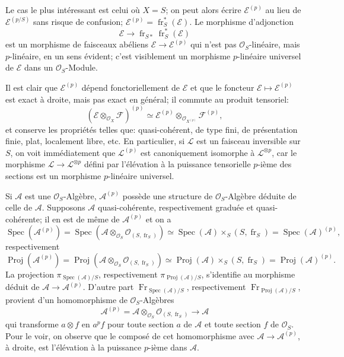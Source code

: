 \documentclass[11pt]{article}
\DeclareMathOperator{\Spec}{Spec}
\providecommand{\OO}{\mathcal{O}}
\providecommand{\cE}{\mathcal E}
\providecommand{\cF}{\mathcal F}
\providecommand{\Spec}{\operatorname{Spec}}
\providecommand{\Spec}{\operatorname{Spec}}
\providecommand{\Spec}{\operatorname{Spec}}
\providecommand{\fr}{\operatorname{fr}}
\providecommand{\Fr}{\operatorname{Fr}}
\providecommand{\Proj}{\operatorname{Proj}}
\providecommand{\cL}{\mathcal L}
\begin{document}
Le cas le plus intéressant est celui où $X=S$; on peut alors écrire $\cE^{(p)}$ au lieu de $\cE^{(p/S)}$ sans risque de confusion; $\cE^{(p)}=\fr_S^*(\cE)$. Le morphisme d'adjonction
\[
\cE\longrightarrow \fr_{S*}\fr_S^*(\cE)
\]
est un morphisme de faisceaux abéliens $\cE\to\cE^{(p)}$ qui n'est pas $\OO_S$-linéaire, mais $p$-linéaire, en un sens évident; c'est visiblement un morphisme $p$-linéaire universel de $\cE$ dans un $\OO_S$-Module.

Il est clair que $\cE^{(p)}$ dépend fonctoriellement de $\cE$ et que le foncteur $\cE\mapsto\cE^{(p)}$ est exact à droite, mais pas exact en général; il commute au produit tensoriel:
\[
(\cE\otimes_{\OO_X}\cF)^{(p)}\simeq
\cE^{(p)}\otimes_{\OO_{X^{(p)}}}\cF^{(p)},
\]
et conserve les propriétés telles que: quasi-cohérent, de type fini, de présentation finie, plat, localement libre, etc. En particulier, si $\cL$ est un faisceau inversible sur $S$, on voit immédiatement que $\cL^{(p)}$ est canoniquement isomorphe à $\cL^{\otimes p}$, car le morphisme $\cL\to\cL^{\otimes p}$ défini par l'élévation à la puissance tensorielle $p$-ième des sections est un morphisme $p$-linéaire universel.

Si $\mathcal{A}$ est une $\OO_S$-Algèbre, $\mathcal{A}^{(p)}$ possède une structure de $\OO_S$-Algèbre déduite de celle de $\mathcal{A}$. Supposons $\mathcal{A}$ quasi-cohérente, respectivement graduée et quasi-cohérente; il en est de même de $\mathcal{A}^{(p)}$ et on a
\[
\Spec(\mathcal{A}^{(p)})=\Spec(\mathcal{A}\otimes_{\OO_S}\OO_{(S,\fr_S)})
 \simeq \Spec(\mathcal{A})\times_S(S,\fr_S)=\Spec(\mathcal{A})^{(p)},
\]
respectivement
\[
\Proj(\mathcal{A}^{(p)})=\Proj(\mathcal{A}\otimes_{\OO_S}\OO_{(S,\fr_S)})
 \simeq \Proj(\mathcal{A})\times_S(S,\fr_S)=\Proj(\mathcal{A})^{(p)}.
\]
La projection $\pi_{\Spec(\mathcal{A})/S}$, respectivement $\pi_{\Proj(\mathcal{A})/S}$, s'identifie au morphisme déduit de $\mathcal{A}\to\mathcal{A}^{(p)}$. D'autre part $\Fr_{\Spec(\mathcal{A})/S}$, respectivement $\Fr_{\Proj(\mathcal{A})/S}$, provient d'un homomorphisme de $\OO_S$-Algèbres
\[
\mathcal{A}^{(p)}=\mathcal{A}\otimes_{\OO_S}\OO_{(S,\fr_S)}\longrightarrow \mathcal{A}
\]
qui transforme $a\otimes f$ en $a^p f$ pour toute section $a$ de $\mathcal{A}$ et toute section $f$ de $\OO_S$. Pour le voir, on observe que le composé de cet homomorphisme avec $\mathcal{A}\to\mathcal{A}^{(p)}$, à droite, est l'élévation à la puissance $p$-ième dans $\mathcal{A}$.
\end{document}
